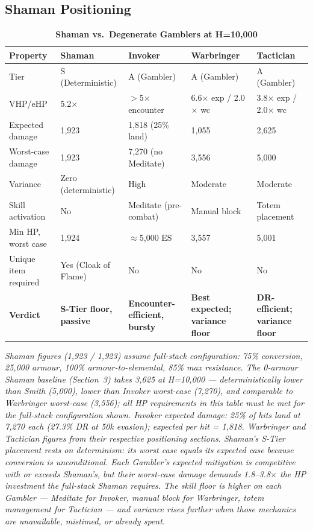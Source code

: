\documentclass[12pt, letterpaper]{article}
\newcommand{\namedsubsection}[1]{%
    \subsection*{#1}%
    \addcontentsline{toc}{subsection}{#1}%
}
\begin{document}
\namedsubsection{Shaman Positioning}

\begin{table}[htbp]
\centering
\caption{\textbf{Shaman vs.\ Degenerate Gamblers at H=10{,}000}}
{\small
\begin{tabular}{lllll}
\toprule
\textbf{Property} & \textbf{Shaman} & \textbf{Invoker} & \textbf{Warbringer} & \textbf{Tactician} \\
\midrule
\rowcolor{rowalt} Tier & S (Deterministic) & A (Gambler) & A (Gambler) & A (Gambler) \\
VHP/eHP & 5.2$\times$ & $>$5$\times$ encounter & 6.6$\times$ exp / 2.0$\times$ wc & 3.8$\times$ exp / 2.0$\times$ wc \\
\rowcolor{rowalt} Expected damage & 1{,}923 & 1{,}818 (25\% land) & 1{,}055 & 2{,}625 \\
Worst-case damage & 1{,}923 & 7{,}270 (no Meditate) & 3{,}556 & 5{,}000 \\
\rowcolor{rowalt} Variance & Zero (deterministic) & High & Moderate & Moderate \\
Skill activation & No & Meditate (pre-combat) & Manual block & Totem placement \\
\rowcolor{rowalt} Min HP, worst case & 1{,}924 & $\approx$5{,}000 ES & 3{,}557 & 5{,}001 \\
Unique item required & Yes (Cloak of Flame) & No & No & No \\
\rowcolor{rowhi} \textbf{Verdict} & \textbf{S-Tier floor, passive} & \textbf{Encounter-efficient, bursty} & \textbf{Best expected; variance floor} & \textbf{DR-efficient; variance floor} \\
\bottomrule
\end{tabular}
}
\smallskip
\begin{minipage}{\linewidth}
\small\textit{Shaman figures (1{,}923 / 1{,}923) assume full-stack configuration: 75\% conversion, 25{,}000 armour, 100\% armour-to-elemental, 85\% max resistance. The 0-armour Shaman baseline (Section~3) takes 3{,}625 at H=10{,}000 --- deterministically lower than Smith (5{,}000), lower than Invoker worst-case (7{,}270), and comparable to Warbringer worst-case (3{,}556); all HP requirements in this table must be met for the full-stack configuration shown. Invoker expected damage: 25\% of hits land at 7{,}270 each (27.3\% DR at 50k evasion); expected per hit = 1{,}818. Warbringer and Tactician figures from their respective positioning sections. Shaman's S-Tier placement rests on determinism: its worst case equals its expected case because conversion is unconditional. Each Gambler's expected mitigation is competitive with or exceeds Shaman's, but their worst-case damage demands 1.8--3.8$\times$ the HP investment the full-stack Shaman requires. The skill floor is higher on each Gambler --- Meditate for Invoker, manual block for Warbringer, totem management for Tactician --- and variance rises further when those mechanics are unavailable, mistimed, or already spent.}
\end{minipage}
\end{table}
\end{document}
